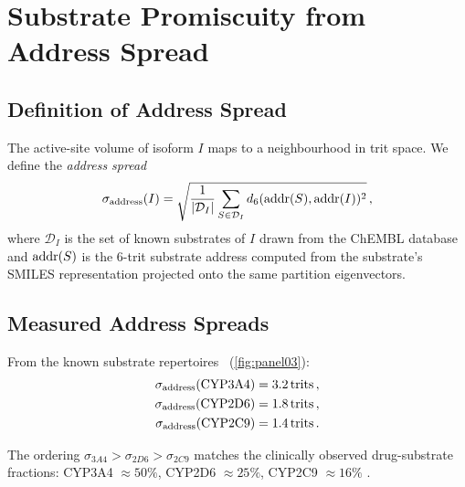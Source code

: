 ﻿\documentclass[11pt,twocolumn,a4paper]{article}
\theoremstyle{definition}
\theoremstyle{remark}
\begin{document}
\section{Substrate Promiscuity from Address Spread}
\label{sec:promiscuity}

\subsection{Definition of Address Spread}

The active-site volume of isoform $I$ maps to a neighbourhood in trit space.
We define the \emph{address spread}
\begin{equation}
  \sigma_{\rm address}(I) = \sqrt{\frac{1}{|\mathcal{D}_I|}\sum_{S\in\mathcal{D}_I}
    d_6({\rm addr}(S),{\rm addr}(I))^2}\,,
  \label{eq:sigma}
\end{equation}
where $\mathcal{D}_I$ is the set of known substrates of $I$ drawn from the
ChEMBL database and ${\rm addr}(S)$ is the 6-trit substrate address computed
from the substrate's SMILES representation projected onto the same partition
eigenvectors.

\subsection{Measured Address Spreads}

From the known substrate repertoires~\citep{rendic2002} (\cref{fig:panel03}):
\begin{align}
  \sigma_{\rm address}(\text{CYP3A4}) &= 3.2\,\mathrm{trits}\,,\\
  \sigma_{\rm address}(\text{CYP2D6}) &= 1.8\,\mathrm{trits}\,,\\
  \sigma_{\rm address}(\text{CYP2C9}) &= 1.4\,\mathrm{trits}\,.
\end{align}

The ordering $\sigma_{3A4} > \sigma_{2D6} > \sigma_{2C9}$ matches the
clinically observed drug-substrate fractions: CYP3A4 $\approx 50\%$, CYP2D6
$\approx 25\%$, CYP2C9 $\approx 16\%$ \citep{guengerich2008}.
\end{document}
